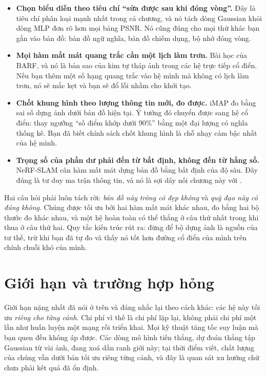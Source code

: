 \documentclass[../../deep_learning.tex]{subfiles}
\begin{document}
\begin{itemize}
\item \textbf{Chọn biểu diễn theo tiêu chí ``sửa được sau khi đóng vòng''.} Đây là tiêu chí phân loại mạnh nhất trong cả chương, và nó tách dòng Gaussian khỏi dòng MLP đơn rõ hơn mọi bảng PSNR. Nó cũng đúng cho mọi thứ khác bạn gắn vào bản đồ: bản đồ ngữ nghĩa, bản đồ chiếm dụng, bộ nhớ đóng vòng.
\item \textbf{Mọi hàm mất mát quang trắc cần một lịch làm trơn.} Bài học của BARF, và nó là bản sao của kim tự tháp ảnh trong các hệ trực tiếp cổ điển. Nếu bạn thêm một số hạng quang trắc vào hệ mình mà không có lịch làm trơn, nó sẽ mắc kẹt và bạn sẽ đổ lỗi nhầm cho khởi tạo.
\item \textbf{Chốt khung hình theo lượng thông tin mới, đo được.} iMAP đo bằng sai số dựng ảnh dưới bản đồ hiện tại. Ý tưởng đó chuyển được sang hệ cổ điển: thay ngưỡng ``số điểm khớp dưới 90\%'' bằng một đại lượng có nghĩa thống kê. Bạn đã biết chính sách chốt khung hình là chỗ nhạy cảm bậc nhất của hệ mình.
\item \textbf{Trọng số của phần dư phải đến từ bất định, không đến từ hằng số.} NeRF-SLAM cân hàm mất mát dựng bản đồ bằng bất định của độ sâu. Đây đúng là tư duy ma trận thông tin, và nó là sợi dây nối chương này với .
\end{itemize}

\begin{cannho}
Hai câu hỏi phải luôn tách rời: \emph{bản đồ này trông có đẹp không} và \emph{quỹ đạo này có đúng không}. Chúng được tối ưu bởi hai hàm mất mát khác nhau, đo bằng hai bộ thước đo khác nhau, và một hệ hoàn toàn có thể thắng ở câu thứ nhất trong khi thua ở câu thứ hai. Quy tắc kiến trúc rút ra: đừng để bộ dựng ảnh là nguồn của tư thế, trừ khi bạn đã tự đo và thấy nó tốt hơn đường cổ điển của mình trên chính chuỗi khó của mình. 
\end{cannho}

\section{Giới hạn và trường hợp hỏng}
Giới hạn nặng nhất đã nói ở trên và đáng nhắc lại theo cách khác: các hệ này tối ưu \emph{riêng cho từng cảnh}. Chi phí vì thế là chi phí lặp lại, không phải chi phí một lần như huấn luyện một mạng rồi triển khai. Mọi kỹ thuật tăng tốc suy luận mà bạn quen đều không áp được. Các dòng mô hình tiến thẳng, dự đoán thẳng tập Gaussian từ vài ảnh, đang xoá dần ranh giới này; tại thời điểm viết, chất lượng của chúng vẫn dưới bản tối ưu riêng từng cảnh, và đây là quan sát xu hướng chứ chưa phải kết quả đã ổn định.
\end{document}
